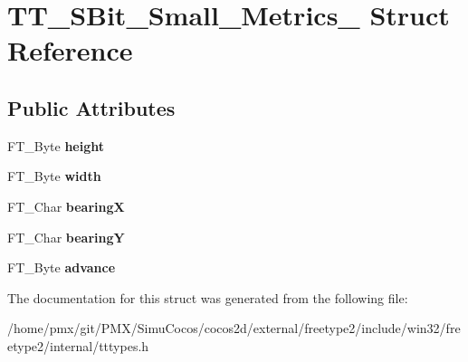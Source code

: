 \hypertarget{structTT__SBit__Small__Metrics__}{}\section{T\+T\+\_\+\+S\+Bit\+\_\+\+Small\+\_\+\+Metrics\+\_\+ Struct Reference}
\label{structTT__SBit__Small__Metrics__}
\subsection*{Public Attributes}
\begin{DoxyCompactItemize}
\item 
\mbox{\label{structTT__SBit__Small__Metrics___aecc44b5e504d5ce27521505ed53420c8}} 
F\+T\+\_\+\+Byte {\bfseries height}
\item 
\mbox{\label{structTT__SBit__Small__Metrics___ad2401ae208b1663d0085ca06a04885fe}} 
F\+T\+\_\+\+Byte {\bfseries width}
\item 
\mbox{\label{structTT__SBit__Small__Metrics___a4361ae83a66706852c0c7d4c4ddff9c2}} 
F\+T\+\_\+\+Char {\bfseries bearingX}
\item 
\mbox{\label{structTT__SBit__Small__Metrics___aba8cbfd6203f4083b8fb305f88d6d1fc}} 
F\+T\+\_\+\+Char {\bfseries bearingY}
\item 
\mbox{\label{structTT__SBit__Small__Metrics___a056c5ea71ec3339ca9b7356ea7c90e37}} 
F\+T\+\_\+\+Byte {\bfseries advance}
\end{DoxyCompactItemize}


The documentation for this struct was generated from the following file\+:\begin{DoxyCompactItemize}
\item 
/home/pmx/git/\+P\+M\+X/\+Simu\+Cocos/cocos2d/external/freetype2/include/win32/freetype2/internal/tttypes.\+h\end{DoxyCompactItemize}
